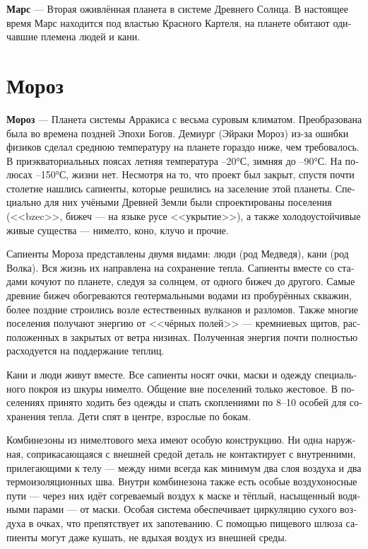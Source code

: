 \documentclass[a4paper,12pt,fleqn]{book}\usepackage{polyglossia}\setdefaultlanguage[babelshorthands=true]{russian}\setotherlanguage{english}\defaultfontfeatures{Ligatures=TeX,Mapping=tex-text}\usepackage{xcolor}\newcommand{\ml}[3]{#2}
\newcommand{\theterm}[3]{\textbf{\hypertarget{#1}{#2}} --- #3}
\begin{document}
\theterm{mars}
{Марс}
{Вторая оживлённая планета в системе Древнего Солнца.
В настоящее время Марс находится под властью Красного Картеля, на планете обитают одичавшие племена людей и кани.}

\section{Мороз}

\theterm{moros}
{Мороз}
{Планета системы Арракиса с весьма суровым климатом.
Преобразована была во времена поздней Эпохи Богов.
Демиург (Эйраки Мороз) из-за ошибки физиков сделал среднюю температуру на планете гораздо ниже, чем требовалось.
В приэкваториальных поясах летняя температура --20°С, зимняя до --90°С. На полюсах --150°С, жизни нет.
Несмотря на то, что проект был закрыт, спустя почти столетие нашлись сапиенты, которые решились на заселение этой планеты.
Специально для них учёными Древней Земли были спроектированы поселения (<<bzec>>, бижеч --- на языке русе <<укрытие>>), а также холодоустойчивые живые существа --- нимелто, коно, клучо и прочие.

Сапиенты Мороза представлены двумя видами: люди (род Медведя), кани (род Волка).
Вся жизнь их направлена на сохранение тепла.
Сапиенты вместе со стадами кочуют по планете, следуя за солнцем, от одного бижеч до другого.
Самые древние бижеч обогреваются геотермальными водами из пробурённых скважин, более поздние строились возле естественных вулканов и разломов.
Также многие поселения получают энергию от <<чёрных полей>> --- кремниевых щитов, расположенных в закрытых от ветра низинах.
Полученная энергия почти полностью расходуется на поддержание теплиц.

Кани и люди живут вместе.
Все сапиенты носят очки, маски и одежду специального покроя из шкуры нимелто.
Общение вне поселений только жестовое.
В поселениях принято ходить без одежды и спать скоплениями по 8--10 особей для сохранения тепла.
Дети спят в центре, взрослые по бокам.

Комбинезоны из нимелтового меха имеют особую конструкцию.
Ни одна наружная, соприкасающаяся с внешней средой деталь не контактирует с внутренними, прилегающими к телу --- между ними всегда как минимум два слоя воздуха и два термоизоляционных шва.
Внутри комбинезона также есть особые воздухоносные пути --- через них идёт согреваемый воздух к маске и тёплый, насыщенный водяными парами --- от маски.
Особая система обеспечивает циркуляцию сухого воздуха в очках, что препятствует их запотеванию.
С помощью пищевого шлюза сапиенты могут даже кушать, не вдыхая воздух из внешней среды.

}
\end{document}

